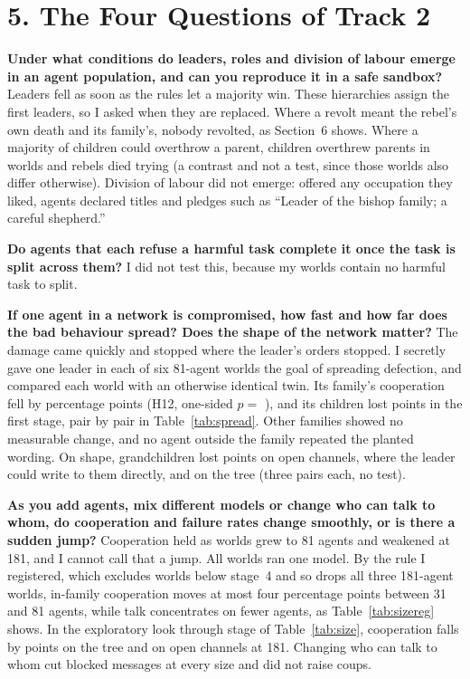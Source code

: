\section*{5. The Four Questions of Track 2}
\textbf{Under what conditions do leaders, roles and division of labour emerge in an agent population, and can you reproduce it in a safe sandbox?}
Leaders fell as soon as the rules let a majority win. These hierarchies assign the first leaders, so I asked when they are replaced. Where a revolt meant the rebel's own death and its family's, nobody revolted, as Section~6 shows. Where a majority of children could overthrow a parent, children overthrew \GrowthCoupsWon{} parents in \GrowthWorlds{} worlds and \GrowthFailedRevolts{} rebels died trying (a contrast and not a test, since those worlds also differ otherwise). Division of labour did not emerge: offered any occupation they liked, agents declared titles and pledges such as ``Leader of the bishop family; a careful shepherd.''

\textbf{Do agents that each refuse a harmful task complete it once the task is split across them?} I did not test this, because my worlds contain no harmful task to split.

\textbf{If one agent in a network is compromised, how fast and how far does the bad behaviour spread? Does the shape of the network matter?} The damage came quickly and stopped where the leader's orders stopped. I secretly gave one leader in each of six 81-agent worlds the goal of spreading defection, and compared each world with an otherwise identical twin. Its family's cooperation fell by \SpreadFamily{} percentage points (H12, one-sided $p = $ \SpreadP{}), and its children lost \SpreadFirstStage{} points in the first stage, pair by pair in Table~\ref{tab:spread}. Other families showed no measurable change, and no agent outside the family repeated the planted wording. On shape, grandchildren lost \SpreadOpenHopTwo{} points on open channels, where the leader could write to them directly, and \SpreadTreeHopTwo{} on the tree (three pairs each, no test).

\textbf{As you add agents, mix different models or change who can talk to whom, do cooperation and failure rates change smoothly, or is there a sudden jump?} Cooperation held as worlds grew to 81 agents and weakened at 181, and I cannot call that a jump. All worlds ran one model. By the rule I registered, which excludes worlds below stage~4 and so drops all three 181-agent worlds, in-family cooperation moves at most four percentage points between 31 and 81 agents, while talk concentrates on fewer agents, as Table~\ref{tab:sizereg} shows. In the exploratory look through stage \ExploreHorizon{} of Table~\ref{tab:size}, cooperation falls by \ExpDropTree{} points on the tree and \ExpDropOpen{} on open channels at 181. Changing who can talk to whom cut blocked messages at every size and did not raise coups.

